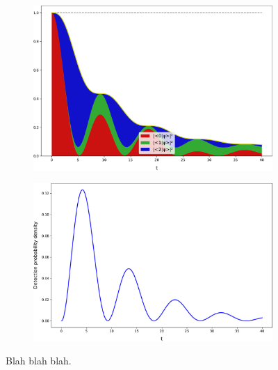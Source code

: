 
\begin{figure}[h]
  \begin{subfigure}[b]{\textwidth}
    \centering
    \includegraphics[width=.8\textwidth]{img/3ldetect/loss3color.pdf}
  \end{subfigure}
  \par\bigskip
  \par\bigskip
  \begin{subfigure}[b]{\textwidth}
    \centering
    \includegraphics[width=.8\textwidth]{img/3ldetect/loss.pdf}
  \end{subfigure}
  \par\bigskip
  \par\bigskip
  \caption{
    Blah blah blah.
  }
\end{figure}